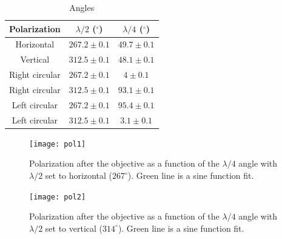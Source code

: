 \begin{table}
\centering
\begin{tabular}{c c c}
 \toprule
    {Polarization} & {$\lambda/2$ ($^\circ$)} & {$\lambda/4$ ($^\circ$)} \\ \midrule\midrule
   Horizontal & $267.2\pm 0.1$ & $49.7\pm0.1$  \\
   Vertical   & $312.5\pm0.1$ & $48.1\pm0.1$\\ \midrule
   Right circular & $267.2\pm 0.1$ & $4\pm 0.1$ \\
   Right circular & $312.5\pm0.1$ & $93.1\pm0.1$\\\midrule
  Left circular & $267.2\pm 0.1$ & $95.4\pm0.1$\\
    Left circular & $312.5\pm0.1$  & $3.1\pm0.1$\\ \bottomrule
\end{tabular}
\caption{Angles}
\label{polarizationstable}
\end{table}


\begin{figure}
\centering
\texttt{[image: pol1]}
\caption{Polarization after the objective as a function of the $\lambda/4$ angle with $\lambda/2$ set to horizontal ($267^\circ$). Green line is a sine function fit.}
\label{pol1}
\end{figure}

\begin{figure}
\centering
\texttt{[image: pol2]}
\caption{Polarization after the objective as a function of the $\lambda/4$ angle with $\lambda/2$ set to vertical ($314^\circ$). Green line is a sine function fit.}
\label{pol2}
\end{figure}

